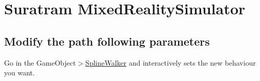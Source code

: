 \section*{Suratram Mixed\+Reality\+Simulator}

\subsection*{Modify the path following parameters}

Go in the Game\+Object$>$\hyperlink{classSplineWalker}{Spline\+Walker} and interactively sets the new behaviour you want. 